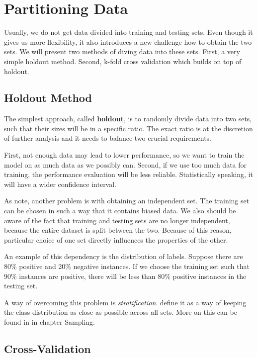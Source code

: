 \section{Partitioning Data}

Usually, we do not get data divided into training and testing sets.
Even though it gives us more flexibility, it also introduces a new challenge how to obtain the two sets.
We will present two methods of diving data into these sets.
First, a very simple holdout method.
Second, k-fold cross validation which builds on top of holdout.

\subsection{Holdout Method}

The simplest approach, called \textbf{holdout}, is to randomly divide data into two sets,
such that their sizes will be in a specific ratio.
The exact ratio is at the discretion of further analysis and it needs to balance two crucial requirements.

First, not enough data may lead to lower performance, so we want to train the model on as much data as we possibly can.
Second, if we use too much data for training, the performance evaluation will be less reliable.
Statistically speaking, it will have a wider confidence interval.

As \citet{TanBachKum08} note, another problem is with obtaining an independent set.
The training set can be chosen in such a way that it contains biased data.
We also should be aware of the fact that training and testing sets are no longer independent,
because the entire dataset is split between the two.
Because of this reason, particular choice of one set directly influences the properties of the other.

An example of this dependency is the distribution of labels.
Suppose there are 80\% positive and 20\% negative instances.
If we choose the training set such that 90\% instances are positive,
there will be less than 80\% positive instances in the testing set.

A way of overcoming this problem is \textit{stratification}.
\citet{sammut2011encyclopedia} define it as a way of keeping the class
distribution as close as possible across all sets.
More on this can be found in  \citet{TanBachKum08} in chapter Sampling.


\subsection{Cross-Validation}


